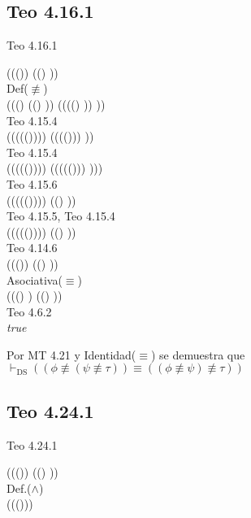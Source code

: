 \documentclass{article}
\begin{document}
\subsection{Teo 4.16.1}
\begin{logicenv}{Teo 4.16.1}
    \begin{derivation}
            ((\phi \not\equiv (\psi \not\equiv \tau)) \equiv ((\phi \not\equiv \psi) \not\equiv \tau))\\
        Def($\not\equiv$)\\
            (((\neg \phi) \equiv ((\neg \psi) \equiv \tau)) \equiv ((\neg ((\neg \phi) \equiv \psi)) \equiv \tau))\\
        Teo 4.15.4\\
            ((\neg (\phi \equiv (\neg (\psi \equiv \tau)))) \equiv ((\neg (\neg (\phi \equiv \psi))) \equiv \tau))\\
        Teo 4.15.4\\
            ((\neg (\phi \equiv (\neg (\psi \equiv \tau)))) \equiv ((\neg (\neg ((\phi \equiv \psi))) \equiv \tau)))\\
        Teo 4.15.6\\
            ((\neg (\phi \equiv (\neg (\psi \equiv \tau)))) \equiv ((\phi \equiv \psi) \equiv \tau))\\
        Teo 4.15.5, Teo 4.15.4\\
            ((\neg (\neg (\phi \equiv (\psi \equiv \tau)))) \equiv ((\phi \equiv \psi) \equiv \tau))\\
        Teo 4.14.6\\
            ((\phi \equiv (\psi \equiv \tau)) \equiv ((\phi \equiv \psi) \equiv \tau))\\
        Asociativa($\equiv$)\\
            (((\phi \equiv \psi) \equiv \tau) \equiv ((\phi \equiv \psi) \equiv \tau))\\
        Teo 4.6.2\\
        \textrm{\textit{true}}
    \end{derivation}
    Por MT 4.21 y Identidad($\equiv$) se demuestra que\\
    $\vdash_{\text{DS}} ((\phi \not\equiv (\psi \not\equiv \tau)) \equiv ((\phi \not\equiv \psi) \not\equiv \tau))$
\end{logicenv}

\subsection{Teo 4.24.1}
\begin{logicenv}{Teo 4.24.1}
    \begin{derivation}
            ((\phi \land (\psi \land \tau)) \equiv ((\phi \land \psi) \land \tau))\\
        Def.($\land$)\\
            ((\phi \equiv ()))
    \end{derivation}
\end{logicenv}
\end{document}
